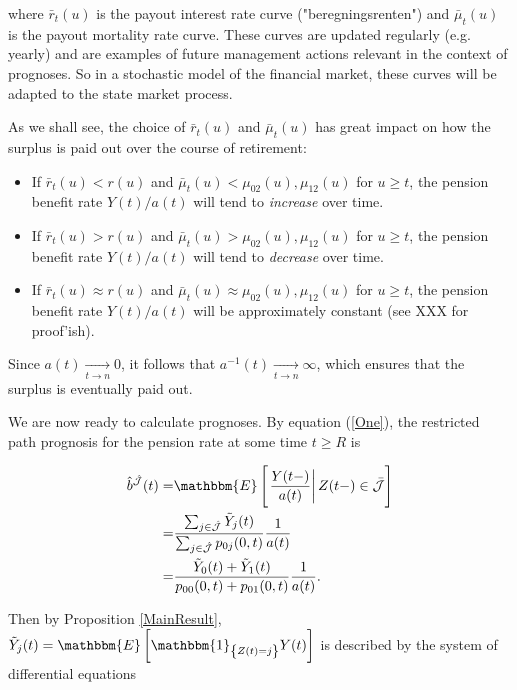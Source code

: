 \documentclass{article}
\newcommand{\1}[1]{\mathbbm{1}_{\left\lbrace #1 \right\rbrace}}
\newcommand{\expec}[1][def]{\mathbbm{E} \left[ #1 \right]}
\newcommand{\econd}[2][def]{\mathbbm{E} \left[ \left. #1 \right| #2 \right]}
\theoremstyle{break}
\theoremstyle{remark}
\newenvironment{remark}
  {\pushQED{\qed}\renewcommand{\qedsymbol}{\scalebox{1.4}{$\circ$}}\remarkx}
  {\popQED\endremarkx}
\numberwithin{equation}{section}
\begin{document}
where $\bar{r}_t(u)$ is the payout interest rate curve ("beregningsrenten") and $\bar{\mu}_t(u)$ is the payout mortality rate curve. These curves are updated regularly (e.g. yearly) and are examples of future management actions relevant in the context of prognoses. So in a stochastic model of the financial market, these curves will be adapted to the state market process.

\begin{remark}
	As we shall see, the choice of $\bar{r}_t(u)$ and $\bar{\mu}_t(u)$ has great impact on how the surplus is paid out over the course of retirement:

\begin{itemize}
	\item If $\bar{r}_t(u)<r(u)$ and $\bar{\mu}_t(u)<\mu_{02}(u),\mu_{12}(u)$ for $u \geq t$, the pension benefit rate $Y(t)/a(t)$ will tend to \textit{increase} over time.
	\item If $\bar{r}_t(u)>r(u)$ and $\bar{\mu}_t(u)>\mu_{02}(u),\mu_{12}(u)$ for $u \geq t$, the pension benefit rate $Y(t)/a(t)$ will tend to \textit{decrease} over time.
	\item If $\bar{r}_t(u)\approx r(u)$ and $\bar{\mu}_t(u)\approx \mu_{02}(u),\mu_{12}(u)$ for $u \geq t$, the pension benefit rate $Y(t)/a(t)$ will be approximately constant (see XXX for proof'ish).
\end{itemize}

Since $a(t) \underset{t \to n}{\longrightarrow} 0$, it follows that $a^{-1}(t) \underset{t \to n}{\longrightarrow} \infty$, which ensures that the surplus is eventually paid out.
\end{remark}

We are now ready to calculate prognoses. By equation (\ref{One}), the restricted path prognosis for the pension rate at some time $t \geq R$ is

\begin{align} \label{Naja}
\begin{split}
		\hat{b}^{\hat{\mathcal{J}}}(t) =& \econd[\frac{Y(t-)}{a(t)}]{Z(t-) \in \bar{\mathcal{J}}} \\
	=&\frac{\sum_{j \in \hat{\mathcal{J}}} \tilde{Y}_j(t)}{\sum_{j \in \hat{\mathcal{J}}} p_{0j}(0,t)} \frac{1}{a(t)} \\
	=&\frac{\tilde{Y}_0(t) + \tilde{Y}_1(t)}{p_{00}(0,t) + p_{01}(0,t)} \frac{1}{a(t)}.
\end{split}
\end{align}

Then by Proposition \ref{MainResult}, $\tilde{Y}_j(t) = \expec[\1{Z(t)=j} Y(t)]$ is described by the system of differential equations
\end{document}
